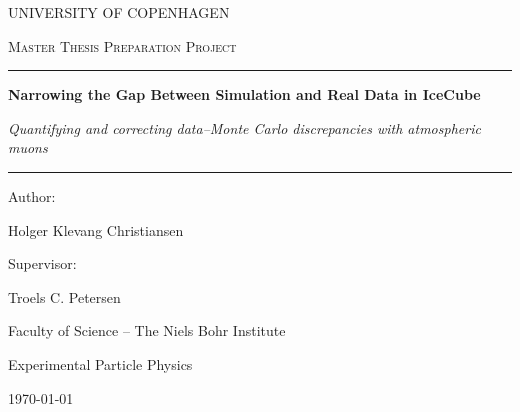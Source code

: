 \begin{titlepage}
    \centering

    \vspace*{0.2cm}


    {\Large \textcolor{BrickRed}{UNIVERSITY OF COPENHAGEN}\par}
    \vspace{1.2cm}

    {\Large\scshape Master Thesis Preparation Project\par}
    \vspace{1cm}


    \rule{\textwidth}{0.4pt}
    \vspace{0.4cm}

    {\LARGE\bfseries
    Narrowing the Gap Between Simulation and Real Data in IceCube
    \par}

    \vspace{0.5cm}
    {\large\itshape
    Quantifying and correcting data--Monte Carlo discrepancies with atmospheric muons
    \par}

    \vspace{0.4cm}
    \rule{\textwidth}{0.4pt}

    \vspace{1.2cm}

    \noindent
    \begin{minipage}[t]{0.48\textwidth}
        \raggedright
        {\large \textcolor{BrickRed}{Author:}\par}
        {\large Holger Klevang Christiansen\par}
    \end{minipage}%
    \hfill
    \begin{minipage}[t]{0.48\textwidth}
        \raggedleft
        {\large \textcolor{BrickRed}{Supervisor:}\par}
        {\large Troels C. Petersen\par}
    \end{minipage}

    \vfill

    {\large \textcolor{BrickRed}{Faculty of Science -- The Niels Bohr Institute}\par}
    {\large \textcolor{BrickRed}{Experimental Particle Physics}\par}

    \vfill

    {\large \today\par}

\end{titlepage}
